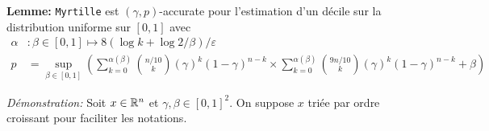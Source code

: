 
\usepackage{tkz-base}
\usepackage{algorithm}
\usepackage{algorithmic}
\setlength\parindent{0pt}

       

\sloppy                  

\pgfplotsset{compat=1.16}






\textbf{Lemme: } \texttt{Myrtille} est \((\gamma, p)\)-accurate pour l'estimation d'un décile sur la distribution uniforme sur \([0,1]\) avec
\begin{align*}
    \alpha & : \beta \in [0,1] \mapsto  8\left( \log k + \log 2/\beta \right)/\varepsilon\\
    p & = \sup_{\beta \in [0,1]}\left( \sum_{k = 0}^{\alpha(\beta)} \binom{n/10}{k}\left( \gamma \right)^k (1 - \gamma)^{n-k} \times \sum_{k = 0}^{\alpha(\beta)} \binom{9n/10}{k}\left( \gamma \right)^k (1 - \gamma)^{n-k} + \beta \right)
\end{align*}



\textit{Démonstration:} Soit \(x \in \mathbb{R}^n\) et \(\gamma, \beta \in [0,1]^2\). On suppose \(x\) triée par ordre croissant pour faciliter les notations.\\

